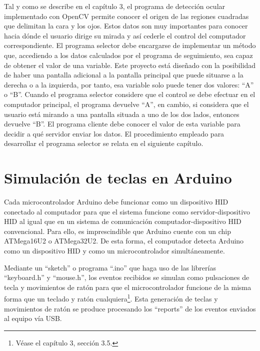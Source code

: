 Tal y como se describe en el capítulo 3, el programa de detección ocular implementado con OpenCV permite conocer el origen de las regiones cuadradas que delimitan la cara y los ojos. Estos datos son muy importantes para conocer hacia dónde el usuario dirige su mirada y así cederle el control del computador correspondiente. El programa selector debe encargarse de implementar un método que, accediendo a los datos calculados por el programa de seguimiento, sea capaz de obtener el valor de una variable. Este proyecto está diseñado con la posibilidad de haber una pantalla adicional a la pantalla principal que puede situarse a la derecha o a la izquierda, por tanto, esa variable solo puede tener dos valores: ``A'' o ``B''. Cuando el programa selector considere que el control se debe efectuar en el computador principal, el programa devuelve ``A'', en cambio, si considera que el usuario está mirando a una pantalla situada a uno de los dos lados, entonces devuelve ``B''. El programa cliente debe conocer el valor de esta variable para decidir a qué servidor enviar los datos. El procedimiento empleado para desarrollar el programa selector se relata en el siguiente capítulo.






\section{Simulación de teclas en Arduino} \label{s2_5}

Cada microcontrolador Arduino debe funcionar como un dispositivo HID conectado al computador para que el sistema funcione como servidor-dispositivo HID al igual que en un sistema de comunicación computador-dispositivo HID convencional. Para ello, es imprescindible que Arduino cuente con un chip ATMega16U2 o ATMega32U2. De esta forma, el computador detecta Arduino como un dispositivo HID y como un microcontrolador simultáneamente.

Mediante un ``sketch'' o programa ``.ino'' que haga uso de las librerías ``keyboard.h'' y ``mouse.h'', los eventos recibidos se simulan como pulsaciones de tecla y movimientos de ratón para que el microcontrolador funcione de la misma forma que un teclado y ratón cualquiera\footnote{Véase el capítulo 3, sección 3.5.}. Esta generación de teclas y movimientos de ratón se produce procesando los ``reports'' de los eventos enviados al equipo vía USB.


